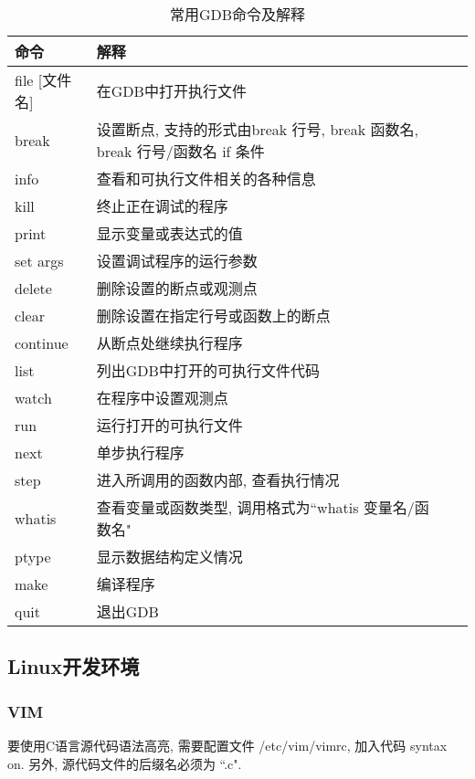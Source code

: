 \begin{table}[H]
 \small %
\sffamily %
\centering %
\renewcommand{\arraystretch}{1.4} %
\caption{常用GDB命令及解释}
\begin{tabular}{*{2}{l|l}}
 \hline
 \bfseries 命令 & \bfseries 解释\\ \hline
 file [文件名] & 在GDB中打开执行文件\\ \hline
 break & 设置断点, 支持的形式由break 行号, break 函数名, break 行号/函数名 if 条件\\ \hline
 info & 查看和可执行文件相关的各种信息\\ \hline
 kill & 终止正在调试的程序\\ \hline
 print & 显示变量或表达式的值\\ \hline
 set args & 设置调试程序的运行参数\\ \hline
 delete & 删除设置的断点或观测点\\ \hline
 clear & 删除设置在指定行号或函数上的断点\\ \hline
 continue & 从断点处继续执行程序\\ \hline
 list & 列出GDB中打开的可执行文件代码\\ \hline
 watch & 在程序中设置观测点\\ \hline
 run & 运行打开的可执行文件\\ \hline
 next & 单步执行程序\\ \hline
 step & 进入所调用的函数内部, 查看执行情况\\ \hline
 whatis & 查看变量或函数类型, 调用格式为``whatis 变量名/函数名"\\ \hline
 ptype & 显示数据结构定义情况\\ \hline
 make & 编译程序\\ \hline
 quit & 退出GDB\\ \hline
\end{tabular}
\end{table}


\subsection{Linux开发环境}
\subsubsection{VIM}
要使用C语言源代码语法高亮, 需要配置文件 /etc/vim/vimrc, 加入代码 syntax on.
另外, 源代码文件的后缀名必须为 ``.c".

